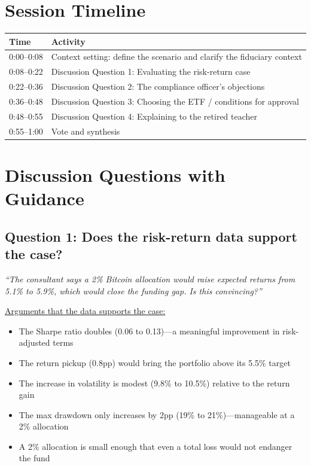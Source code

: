 \documentclass[11pt]{article}
\begin{document}

\section*{Session Timeline}

\begin{center}
\begin{tabular}{ll}
\toprule
\textbf{Time} & \textbf{Activity} \\
\midrule
0:00--0:08 & Context setting: define the scenario and clarify the fiduciary context \\
0:08--0:22 & Discussion Question 1: Evaluating the risk-return case \\
0:22--0:36 & Discussion Question 2: The compliance officer's objections \\
0:36--0:48 & Discussion Question 3: Choosing the ETF / conditions for approval \\
0:48--0:55 & Discussion Question 4: Explaining to the retired teacher \\
0:55--1:00 & Vote and synthesis \\
\bottomrule
\end{tabular}
\end{center}

\section*{Discussion Questions with Guidance}

\subsection*{Question 1: Does the risk-return data support the case?}

\textit{``The consultant says a 2\% Bitcoin allocation would raise expected returns from 5.1\% to 5.9\%, which would close the funding gap. Is this convincing?''}

\medskip
\noindent\underline{Arguments that the data supports the case:}
\begin{itemize}[leftmargin=*]
\item The Sharpe ratio doubles (0.06 to 0.13)---a meaningful improvement in risk-adjusted terms
\item The return pickup (0.8pp) would bring the portfolio above its 5.5\% target
\item The increase in volatility is modest (9.8\% to 10.5\%) relative to the return gain
\item The max drawdown only increases by 2pp (19\% to 21\%)---manageable at a 2\% allocation
\item A 2\% allocation is small enough that even a total loss would not endanger the fund
\end{itemize}
\end{document}
